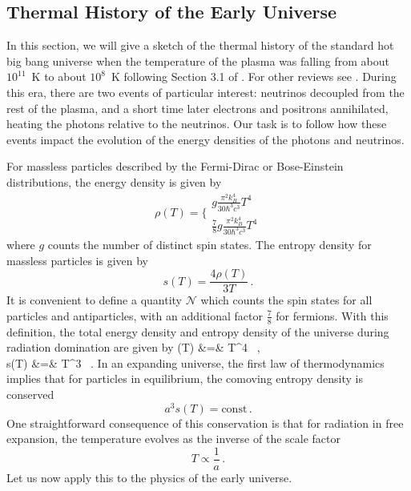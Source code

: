 \subsection{Thermal History of the Early Universe} \label{ThermalHistory}
In this section, we will give a sketch of the thermal history of the standard hot big bang universe when the temperature of the plasma was falling from about $10^{11}$~K to about $10^8$~K following Section 3.1 of \cite{Weinberg:2008zzc}.  For other reviews see \cite{Dolgov:2002wy,Agashe:2014kda}.  During this era, there are two events of particular interest: neutrinos decoupled from the rest of the plasma, and a short time later electrons and positrons annihilated, heating the photons relative to the neutrinos.  Our task is to follow how these events impact the evolution of the energy densities of the photons and neutrinos.

For massless particles described by the Fermi-Dirac or Bose-Einstein distributions, the energy density is given by
\begin{equation}
	\rho(T) =
	\Bigg\{\begin{array}{l}
        g\frac{\pi^2k_B^4}{30\hbar^3 c^3}T^4  \\
       \frac{7}{8}g\frac{\pi^2k_B^4}{30\hbar^3 c^3} T^4 
        \end{array}
\end{equation}
where $g$ counts the number of distinct spin states.  The entropy density for massless particles is given by
\begin{equation}
	s(T) = \frac{4\rho(T)}{3T} \, .
\end{equation}
It is convenient to define a quantity $\mathcal{N}$ which counts the spin states for all particles and antiparticles, with an additional factor $\frac{7}{8}$ for fermions.  With this definition, the total energy density and entropy density of the universe during radiation domination are given by
\bea
	\rho(T) &=& T^4 \, , \nonumber \\
	s(T) &=& T^3 \, .
\eea
In an expanding universe, the first law of thermodynamics implies that for particles in equilibrium, the comoving entropy density is conserved
\begin{equation}
	a^3s(T) = \mathrm{const} \, .
\end{equation}
One straightforward consequence of this conservation is that for radiation in free expansion, the temperature evolves as the inverse of the scale factor
\begin{equation}
	T\propto \frac{1}{a} \, .
\end{equation}
Let us now apply this to the physics of the early universe.

